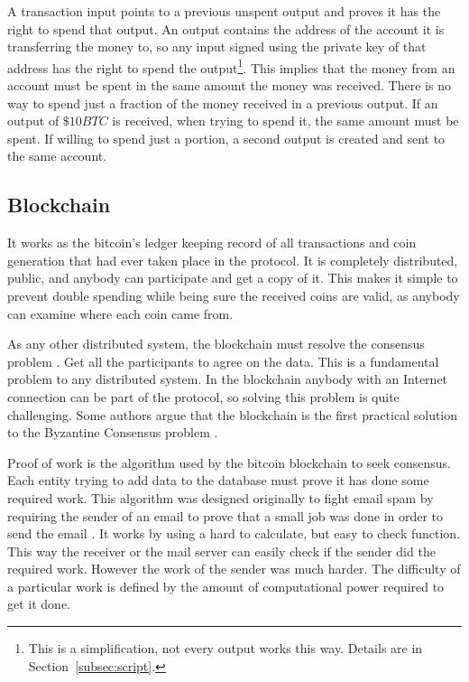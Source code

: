 A transaction input points to a previous unspent output and proves it has the
  right to spend that output.
An output contains the address of the account it is transferring the money to,
  so any input signed using the private key of that address has the right to
  spend the output\footnote{This is a simplification, not every output works
  this way. Details are in Section~\ref{subsec:script}.}.
This implies that the money from an account must be spent in the same amount
  the money was received. There is no way to spend just a fraction of the money
  received in a previous output. If an output of $\$ 10BTC$ is received, when
  trying to spend it, the same amount must be spent. If willing to spend just a
  portion, a second output is created and sent to the same account.

\subsection{Blockchain} \label{subsec:Blockchain}
It works as the bitcoin's ledger keeping record of all transactions and coin
  generation that had ever taken place in the protocol.
It is completely distributed, public, and anybody can participate and get a
  copy of it.
This makes it simple to prevent double spending while being sure the received
  coins are valid, as anybody can examine where each coin came from.

As any other distributed system, the blockchain must resolve the consensus
  problem \cite{fischer1983consensus}. Get all the participants to agree on
  the data. This is a fundamental problem to any distributed system. In the
  blockchain anybody with an Internet connection can be part of the
  protocol, so solving this problem is quite challenging. Some authors argue
  that the blockchain is the first practical solution to the Byzantine Consensus
  problem \cite{miller2014anonymous,sun2014solving}.

Proof of work is the algorithm used by the bitcoin blockchain to seek
  consensus. Each entity trying to add data to the database must prove it
  has done some required work. This algorithm was designed originally to fight
  email spam by requiring the sender of an email to prove that a small job was
  done in order to send the email \cite{dwork1992pricing}.
It works by using a hard to calculate, but easy to check function. This
  way the receiver or the mail server can easily check if the sender did
  the required work.
However the work of the sender was much harder.
The difficulty of a particular work is defined by the amount of computational
  power required to get it done.

